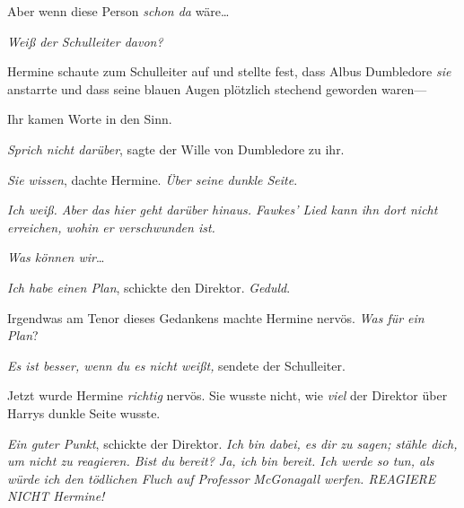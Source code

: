Aber wenn diese Person \emph{schon da} wäre…

\emph{Weiß der Schulleiter davon?}

Hermine schaute zum Schulleiter auf und stellte fest, dass Albus Dumbledore \emph{sie} anstarrte und dass seine blauen Augen plötzlich stechend geworden waren—

Ihr kamen Worte in den Sinn.

\emph{Sprich nicht darüber}, sagte der Wille von Dumbledore zu ihr.

\emph{Sie wissen}, dachte Hermine. \emph{Über seine dunkle Seite}.

\emph{Ich weiß. Aber das hier geht darüber hinaus. Fawkes' Lied kann ihn dort nicht erreichen, wohin er verschwunden ist.}

\emph{Was können wir}…

\emph{Ich habe einen Plan}, schickte den Direktor. \emph{Geduld}.

Irgendwas am Tenor dieses Gedankens machte Hermine nervös. \emph{Was für ein Plan}?

\emph{Es ist besser, wenn du es nicht weißt,} sendete der Schulleiter.

Jetzt wurde Hermine \emph{richtig} nervös. Sie wusste nicht, wie \emph{viel} der Direktor über Harrys dunkle Seite wusste.

\emph{Ein guter Punkt}, schickte der Direktor. \emph{Ich bin dabei, es dir zu sagen; stähle dich, um nicht zu reagieren. Bist du bereit? Ja, ich bin bereit. Ich werde so tun, als würde ich den tödlichen Fluch auf Professor} \emph{McGonagall} \emph{werfen. REAGIERE NICHT Hermine!}

